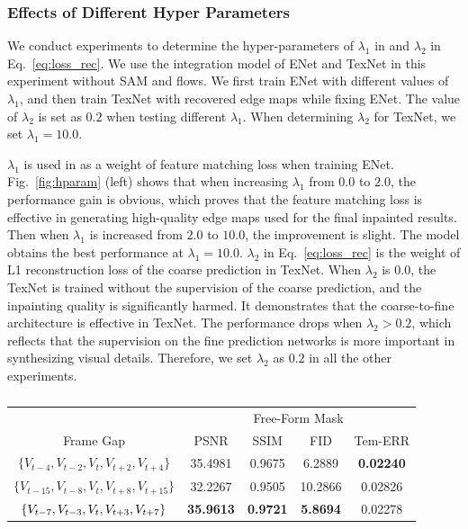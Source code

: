  


\subsubsection{Effects of Different Hyper Parameters}
We conduct experiments to determine the hyper-parameters of $\lambda_1$ in  and $\lambda_2$ in Eq.~\eqref{eq:loss_rec}. 
We use the integration model of ENet and TexNet in this experiment without SAM and flows.
We first train ENet with different values of $\lambda_1$, and then train TexNet with recovered edge maps while fixing ENet. The value of $\lambda_2$ is set as $0.2$ when testing different $\lambda_1$.
When determining $\lambda_2$ for TexNet, we set $\lambda_1=10.0$.

$\lambda_1$ is used in  as a weight of feature matching loss when training ENet.
Fig.~\ref{fig:hparam} (left) shows that when increasing $\lambda_1$ from $0.0$ to $2.0$, the performance gain is obvious, which proves that the feature matching loss is effective in
generating high-quality edge maps used for the final inpainted results. 
Then when $\lambda_1$ is increased from $2.0$ to $10.0$, the improvement is slight.
The model obtains the best performance at $\lambda_1=10.0$.
%
$\lambda_2$ in Eq.~\eqref{eq:loss_rec} is the weight of L1 reconstruction loss of the coarse prediction in TexNet. 
When $\lambda_2$ is $0.0$, the TexNet is trained without the supervision of the coarse prediction, and the inpainting quality is significantly harmed.
It demonstrates that the coarse-to-fine architecture is effective in TexNet. The performance drops when $\lambda_2>0.2$, which reflects that the supervision on the fine prediction networks is more important in synthesizing visual details.
Therefore, we set $\lambda_2$ as $0.2$ in all the other experiments.


\begin{table}[t]
	\caption{ }\smallskip
	\scriptsize
	\centering
	{
		\smallskip\begin{tabular}{c|c|c|c|c}
			\hline
			&\multicolumn{4}{c}{Free-Form Mask}  \\
			\cline{2-5} 
			Frame Gap& PSNR & SSIM & FID & Tem-ERR \\
			
			\hline
			$\{V_{t-4},V_{t-2},V_{t},V_{t+2},V_{t+4}\}$ 
			& 35.4981 & 0.9675 & 6.2889 &\textbf{0.02240} 
			\\ \hline
			$\{V_{t-15},V_{t-8},V_{t},V_{t+8},V_{t+15}\}$ & 32.2267 & 0.9505 &  10.2866 &0.02826
			\\ \hline
		 $\{V_{t-7},V_{t-3},V_{t},V_{t+3},V_{t+7}\}$ &\textbf{35.9613} & \textbf{0.9721}&  \textbf{5.8694} &  0.02278 \\
		
			\hline
			
			
		\end{tabular}
	}
	\label{tab:input-gap}
\end{table}

